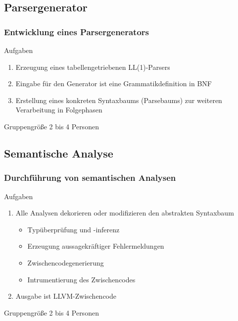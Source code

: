 \documentclass[ucs,9pt]{beamer}
\begin{document}
\subsection{Parsergenerator}
\begin{frame}
  \frametitle{Entwicklung eines Parsergenerators}

  \begin{block}{Aufgaben}
    \begin{enumerate}
      \item Erzeugung eines tabellengetriebenen LL(1)-Parsers
      \item Eingabe für den Generator ist eine Grammatikdefinition in BNF
      \item Erstellung eines konkreten Syntaxbaums (Parsebaums) zur weiteren Verarbeitung in
        Folgephasen
    \end{enumerate}
  \end{block}

  \begin{block}{Gruppengröße}
    2 bis 4 Personen
  \end{block}
\end{frame}

\subsection{Semantische Analyse}
\begin{frame}
  \frametitle{Durchführung von semantischen Analysen}

  \begin{block}{Aufgaben}
    \begin{enumerate}
      \item Alle Analysen dekorieren oder modifizieren den abstrakten Syntaxbaum
        \begin{itemize}
          \item Typüberprüfung und -inferenz
          \item Erzeugung aussagekräftiger Fehlermeldungen
          \item Zwischencodegenerierung
          \item Intrumentierung des Zwischencodes
        \end{itemize}
          \item Ausgabe ist LLVM-Zwischencode 
    \end{enumerate}
  \end{block}

  \begin{block}{Gruppengröße}
    2 bis 4 Personen
  \end{block}
\end{frame}
\end{document}
